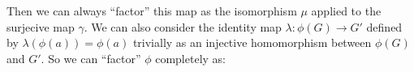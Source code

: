 \begin{center}
\end{center}

Then we can always ``factor'' this map as the isomorphism $\mu$ applied to the surjecive map $\gamma$. We can also consider the identity map $\lambda: \phi(G) \to G'$ defined by $\lambda(\phi(a)) = \phi(a)$ trivially as an injective homomorphism between $\phi(G)$ and $G'$. So we can ``factor'' $\phi$ completely as:

\begin{center}
\end{center}